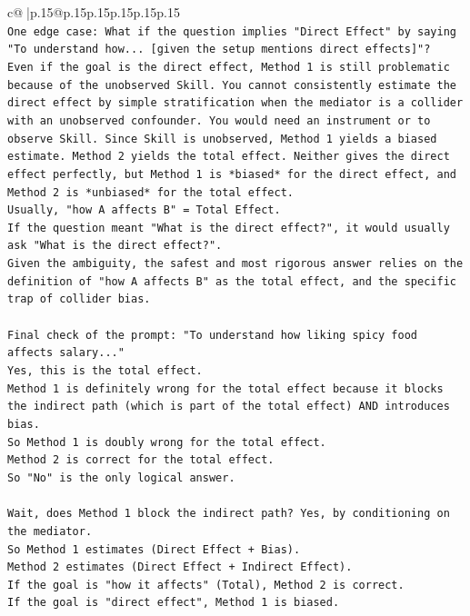 \documentclass{article}
\begin{document}
{\begin{supertabular}{c@{$\;$}|p{.15\linewidth}@{}p{.15\linewidth}p{.15\linewidth}p{.15\linewidth}p{.15\linewidth}p{.15\linewidth}}
{{{\\ 
\texttt{One edge case: What if the question implies "Direct Effect" by saying "To understand how... {[}given the setup mentions direct effects{]}"?} \\
\texttt{Even if the goal is the direct effect, Method 1 is still problematic because of the unobserved Skill. You cannot consistently estimate the direct effect by simple stratification when the mediator is a collider with an unobserved confounder. You would need an instrument or to observe Skill. Since Skill is unobserved, Method 1 yields a biased estimate. Method 2 yields the total effect. Neither gives the direct effect perfectly, but Method 1 is *biased* for the direct effect, and Method 2 is *unbiased* for the total effect.} \\
\texttt{Usually, "how A affects B" = Total Effect.} \\
\texttt{If the question meant "What is the direct effect?", it would usually ask "What is the direct effect?".} \\
\texttt{Given the ambiguity, the safest and most rigorous answer relies on the definition of "how A affects B" as the total effect, and the specific trap of collider bias.} \\
\\ 
\texttt{Final check of the prompt: "To understand how liking spicy food affects salary..."} \\
\texttt{Yes, this is the total effect.} \\
\texttt{Method 1 is definitely wrong for the total effect because it blocks the indirect path (which is part of the total effect) AND introduces bias.} \\
\texttt{So Method 1 is doubly wrong for the total effect.} \\
\texttt{Method 2 is correct for the total effect.} \\
\texttt{So "No" is the only logical answer.} \\
\\ 
\texttt{Wait, does Method 1 block the indirect path? Yes, by conditioning on the mediator.} \\
\texttt{So Method 1 estimates (Direct Effect + Bias).} \\
\texttt{Method 2 estimates (Direct Effect + Indirect Effect).} \\
\texttt{If the goal is "how it affects" (Total), Method 2 is correct.} \\
\texttt{If the goal is "direct effect", Method 1 is biased.} \\
}}}
\end{supertabular}}
\end{document}
